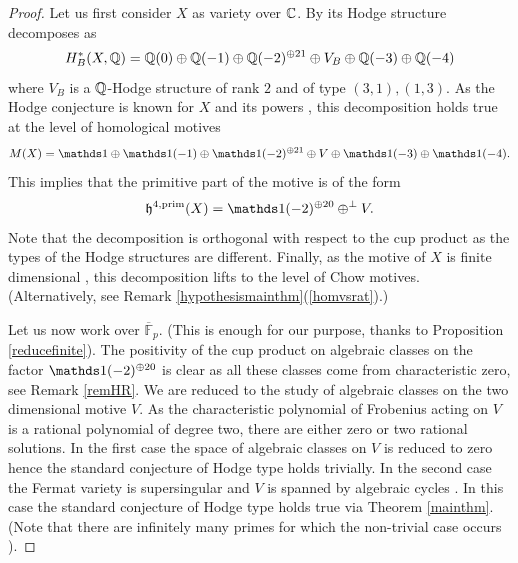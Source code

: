 \begin{proof}
Let us first consider $X$ as variety over $\mathbb{C}$.  By \cite[Proposition 11]{Beauville} its Hodge structure decomposes as
\[H_B^*(X,\mathbb{Q})=\mathbb{Q}(0) \oplus \mathbb{Q}(-1) \oplus \mathbb{Q}(-2)^{\oplus 21} \oplus V_B \oplus \mathbb{Q}(-3) \oplus \mathbb{Q}(-4)\]
where   $V_B$ is a $\mathbb{Q}$-Hodge structure of rank $2$ and of type $(3,1), (1,3)$.
As the Hodge conjecture is known for $X$ and its powers \cite{ShioC}, this decomposition holds true at the level of homological motives
\[M(X)=\one  \oplus \one(-1) \oplus \one(-2)^{\oplus 21} \oplus V \oplus \one(-3) \oplus \one(-4).\]
This implies that the primitive part of the motive  is of the form
\[\mathfrak{h}^{4,\prim}(X)= \one(-2)^{\oplus 20} \oplus^{\perp} V.\]
Note that the decomposition is orthogonal with respect to the cup product as the types of the Hodge structures   are different.
Finally, as the motive of $X$ is finite dimensional \cite[Lemma 5.2]{BLP}, this decomposition lifts to the level of Chow motives. (Alternatively, see Remark \ref{hypothesismainthm}(\ref{homvsrat}).)

Let us now work over $\overline{\mathbb{F}}_p$. (This is enough for our purpose, thanks to Proposition \ref{reducefinite}).  The positivity of the cup product on algebraic classes on the factor $\one(-2)^{\oplus 20}$ is clear as all these classes come from characteristic zero, see Remark \ref{remHR}.
We are reduced to the study of algebraic classes on the two dimensional motive $V$.  As the characteristic polynomial of   Frobenius acting on $V$ is a rational polynomial of degree two, there are either zero or two rational solutions.  In the first case  the space of algebraic classes on $V$ is reduced to  zero hence  the standard conjecture of Hodge type holds trivially. In the second case the Fermat variety is supersingular and $V$ is spanned by algebraic cycles  \cite{ShioF}. In this case the standard conjecture of Hodge type holds true via Theorem \ref{mainthm}. (Note that there are infinitely many primes for which the non-trivial case occurs \cite[Theorem 2.10]{ShioF}).
\end{proof}
